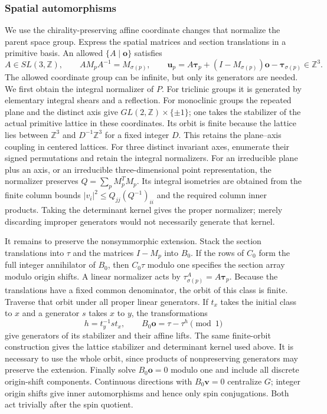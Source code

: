 \subsubsection{Spatial automorphisms}
\label{algmerge:spatial}

We use the chirality-preserving affine coordinate changes that
normalize the parent space group. Express the spatial matrices and
section translations in a primitive basis. An allowed $\{A\mid\bm o\}$
satisfies
\begin{equation}
 A\in SL(3,\mathbb Z),\qquad
 A M_p A^{-1}=M_{\sigma(p)},\qquad
 \bm u_p=A\bm\tau_p+(I-M_{\sigma(p)})\bm o-\bm\tau_{\sigma(p)}
 \in\mathbb Z^3.
 \tag{38c}\label{algmerge:affine}
\end{equation}
The allowed coordinate group can be infinite, but only its
generators are needed. We first obtain the integral normalizer of
$P$. For triclinic groups it is generated by elementary integral
shears and a reflection. For monoclinic groups the repeated plane
and the distinct axis give $GL(2,\mathbb Z)\times\{\pm1\}$;
one takes the stabilizer of the actual primitive lattice in these
coordinates. Its orbit is finite because the lattice lies between
$\mathbb Z^3$ and $D^{-1}\mathbb Z^3$ for a fixed integer $D$.
This retains the plane--axis coupling in centered lattices.
For three distinct invariant axes, enumerate their signed
permutations and retain the integral normalizers. For an
irreducible plane plus an axis, or an irreducible three-dimensional
point representation, the normalizer preserves
$Q=\sum_p M_p^T M_p$. Its integral isometries are obtained from
the finite column bounds
$|v_i|^2\le Q_{jj}(Q^{-1})_{ii}$ and the required column inner
products. Taking the determinant kernel gives the proper
normalizer; merely discarding improper generators would not
necessarily generate that kernel.

It remains to preserve the nonsymmorphic extension. Stack the
section translations into $\tau$ and the matrices $I-M_p$ into
$B_0$. If the rows of $C_0$ form the full integer annihilator of
$B_0$, then $C_0\tau$ modulo one specifies the section array
modulo origin shifts. A linear normalizer acts by
$\tau^A_{\sigma(p)}=A\bm\tau_p$. Because the translations have
a fixed common denominator, the orbit of this class is finite.
Traverse that orbit under all proper linear generators. If
$t_x$ takes the initial class to $x$ and a generator $s$ takes
$x$ to $y$, the transformations
\begin{equation}
 h=t_y^{-1}s t_x,\qquad
 B_0\bm o=\tau-\tau^h\pmod1
 \tag{38d}\label{algmerge:stabilizer}
\end{equation}
give generators of its stabilizer and their affine lifts.
The same finite-orbit construction gives the lattice stabilizer
and determinant kernel used above. It is necessary to use the
whole orbit, since products of nonpreserving generators may
preserve the extension. Finally solve $B_0\bm o=0$ modulo one
and include all discrete origin-shift components. Continuous
directions with $B_0\bm v=0$ centralize $G$; integer origin shifts
give inner automorphisms and hence only spin conjugations.
Both act trivially after the spin quotient.

